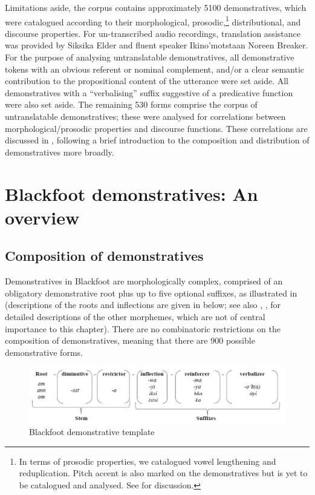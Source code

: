 \documentclass[output=paper,colorlinks,citecolor=brown]{langscibook}
\begin{document}
Limitations aside, the corpus contains approximately 5100 demonstratives, which were catalogued according to their morphological, prosodic,\footnote{In terms of prosodic properties, we catalogued vowel lengthening and reduplication. Pitch accent is also marked on the demonstratives but is yet to be catalogued and analysed. See  for discussion.} distributional, and discourse properties. For un-transcribed audio recordings, translation assistance was provided by Siksika Elder and fluent speaker Ikino’motstaan Noreen Breaker. For the purpose of analysing untranslatable demonstratives, all demonstrative tokens with an obvious referent or nominal complement, and/or a clear semantic contribution to the propositional content of the utterance were set aside. All demonstratives with a “verbalising” suffix suggestive of a predicative function were also set aside. The remaining 530 forms comprise the corpus of untranslatable demonstratives; these were analysed for correlations between morphological/prosodic properties and discourse functions. These correlations are discussed in , following a brief introduction to the composition and distribution of demonstratives more broadly. 


\section{Blackfoot demonstratives: An overview}\label{sec:bliss:3}

\subsection{Composition of demonstratives}\label{sec:bliss:3.1}

Demonstratives in Blackfoot are morphologically complex, comprised of an obligatory demonstrative root plus up to five optional suffixes, as illustrated in  (descriptions of the roots and inflections are given in  below; see also \citet{Bliss2013}, \citet{Frantz2017}, \citet{Schupbach2013} for detailed descriptions of the other morphemes, which are not of central importance to this chapter). There are no combinatoric restrictions on the composition of demonstratives, meaning that there are 900 possible demonstrative forms.

  
\begin{figure}
\includegraphics[width=\textwidth]{figures/6_Figure1.png}
\caption{Blackfoot demonstrative template}
\label{fig:bliss:1} 
\end{figure}
\end{document}
